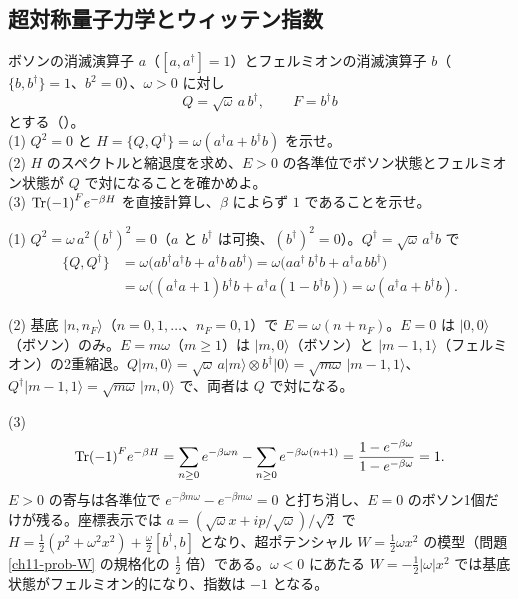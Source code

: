 \subsection{超対称量子力学とウィッテン指数}

\begin{problem}[難易度 A]\label{ch11-prob-sho}
ボソンの消滅演算子 $a$（$[a,a^\dagger]=1$）とフェルミオンの消滅演算子 $b$（$\{b,b^\dagger\}=1$、$b^2=0$）、$\omega>0$ に対し
\[
Q=\sqrt\omega\,a\,b^\dagger,\qquad F=b^\dagger b
\]
とする（）。\\
(1) $Q^2=0$ と $H=\{Q,Q^\dagger\}=\omega(a^\dagger a+b^\dagger b)$ を示せ。\\
(2) $H$ のスペクトルと縮退度を求め、$E>0$ の各準位でボソン状態とフェルミオン状態が $Q$ で対になることを確かめよ。\\
(3) $\Tr(-1)^Fe^{-\beta H}$ を直接計算し、$\beta$ によらず $1$ であることを示せ。
\end{problem}

\begin{solution}
(1) $Q^2=\omega\,a^2(b^\dagger)^2=0$（$a$ と $b^\dagger$ は可換、$(b^\dagger)^2=0$）。$Q^\dagger=\sqrt\omega\,a^\dagger b$ で
\[
\begin{aligned}
\{Q,Q^\dagger\}&=\omega\bigl(ab^\dagger a^\dagger b+a^\dagger b\,ab^\dagger\bigr)=\omega\bigl(aa^\dagger\,b^\dagger b+a^\dagger a\,bb^\dagger\bigr)\\
&=\omega\bigl((a^\dagger a+1)b^\dagger b+a^\dagger a(1-b^\dagger b)\bigr)=\omega(a^\dagger a+b^\dagger b).
\end{aligned}
\]

(2) 基底 $\lvert n,n_F\rangle$（$n=0,1,\dots$、$n_F=0,1$）で $E=\omega(n+n_F)$。$E=0$ は $\lvert0,0\rangle$（ボソン）のみ。$E=m\omega$（$m\ge1$）は $\lvert m,0\rangle$（ボソン）と $\lvert m-1,1\rangle$（フェルミオン）の2重縮退。$Q\lvert m,0\rangle=\sqrt\omega\,a\lvert m\rangle\otimes b^\dagger\lvert0\rangle=\sqrt{m\omega}\,\lvert m-1,1\rangle$、$Q^\dagger\lvert m-1,1\rangle=\sqrt{m\omega}\,\lvert m,0\rangle$ で、両者は $Q$ で対になる。

(3)
\[
\Tr(-1)^Fe^{-\beta H}=\sum_{n\ge0}e^{-\beta\omega n}-\sum_{n\ge0}e^{-\beta\omega(n+1)}=\frac{1-e^{-\beta\omega}}{1-e^{-\beta\omega}}=1 .
\]
$E>0$ の寄与は各準位で $e^{-\beta m\omega}-e^{-\beta m\omega}=0$ と打ち消し、$E=0$ のボソン1個だけが残る。座標表示では $a=(\sqrt\omega x+ip/\sqrt\omega)/\sqrt2$ で $H=\tfrac12(p^2+\omega^2x^2)+\tfrac\omega2[b^\dagger,b]$ となり、超ポテンシャル $W=\tfrac12\omega x^2$ の模型（問題 \ref{ch11-prob-W} の規格化の $\tfrac12$ 倍）である。$\omega<0$ にあたる $W=-\tfrac12\lvert\omega\rvert x^2$ では基底状態がフェルミオン的になり、指数は $-1$ となる。
\end{solution}

